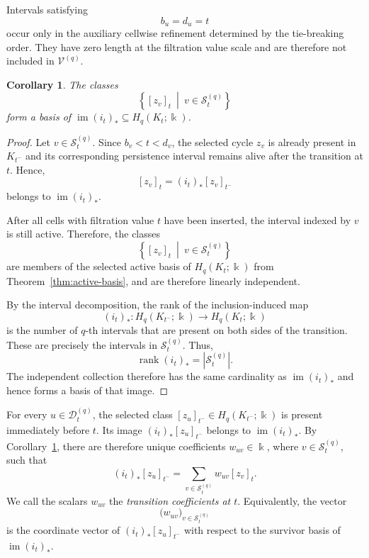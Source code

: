 \documentclass[11pt]{article}
\theoremstyle{paperdefinition}
\theoremstyle{paperplain}
\newtheorem{corollary}[definition]{Corollary}
\theoremstyle{paperremark}
\begin{document}
Intervals satisfying
\[
b_u=d_u=t
\]
occur only in the auxiliary cellwise refinement determined by the tie-breaking order. They have zero length at the filtration value scale and are therefore not included in $\mathcal V^{(q)}$.

\begin{corollary}
\label{cor:survivor-image-basis}
The classes
\[
\left\{[z_v]_t \ \middle|\ v\in\mathcal S_t^{(q)} \right\}
\]
form a basis of $\operatorname{im}(i_t)_* \subseteq H_q(K_t;\Bbbk)$.
\end{corollary}

\begin{proof}
Let $v\in\mathcal S_t^{(q)}$. Since $b_v<t<d_v$, the selected cycle $z_v$ is already present in $K_{t^-}$ and its corresponding persistence interval remains alive after the transition at $t$. Hence,
\[
[z_v]_t = (i_t)_*[z_v]_{t^-}
\]
belongs to $\operatorname{im}(i_t)_*$.

After all cells with filtration value $t$ have been inserted, the interval indexed by $v$ is still active. Therefore, the classes
\[
\left\{[z_v]_t \ \middle|\ v\in\mathcal S_t^{(q)} \right\}
\]
are members of the selected active basis of $H_q(K_t;\Bbbk)$ from Theorem~\ref{thm:active-basis}, and are therefore linearly independent.

By the interval decomposition, the rank of the inclusion-induced map
\[
(i_t)_*: H_q(K_{t^-};\Bbbk) \longrightarrow H_q(K_t;\Bbbk)
\]
is the number of $q$-th intervals that are present on both sides of the transition. These are precisely the intervals in $\mathcal S_t^{(q)}$. Thus,
\[
\operatorname{rank}(i_t)_* = \left|\mathcal S_t^{(q)}\right|.
\]
The independent collection therefore has the same cardinality as $\operatorname{im}(i_t)_*$ and hence forms a basis of that image.
\end{proof}

For every $u\in\mathcal D_t^{(q)}$, the selected class $[z_u]_{t^-} \in H_q(K_{t^-};\Bbbk)$ is present immediately before $t$. Its image $(i_t)_*[z_u]_{t^-}$ belongs to $\operatorname{im}(i_t)_*$. By Corollary~\ref{cor:survivor-image-basis}, there are therefore unique coefficients $w_{uv}\in\Bbbk$, where $v\in\mathcal S_t^{(q)}$, such that
\begin{equation}
\label{eq:transition-relation}
(i_t)_*[z_u]_{t^-} = \sum_{v\in\mathcal S_t^{(q)}}w_{uv}[z_v]_t.
\end{equation}
We call the scalars $w_{uv}$ the \emph{transition coefficients at $t$}. Equivalently, the vector
\[
\bigl(w_{uv}\bigr)_{v\in\mathcal S_t^{(q)}}
\]
is the coordinate vector of $(i_t)_*[z_u]_{t^-}$ with respect to the survivor basis of $\operatorname{im}(i_t)_*$.
\end{document}
